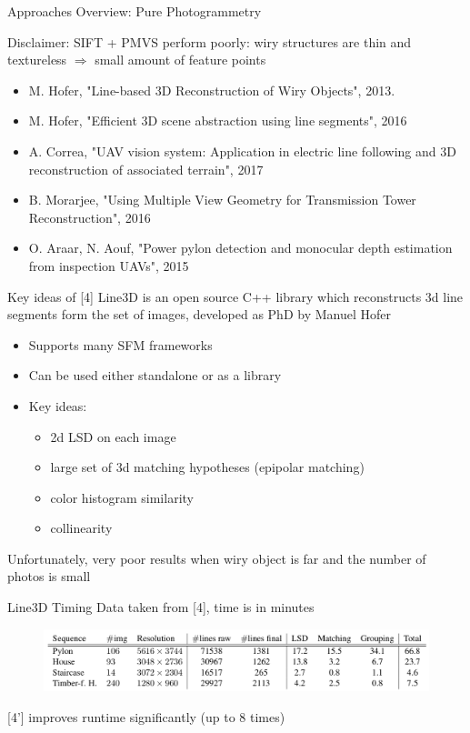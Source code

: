 \documentclass{beamer}
\begin{document}
\begin{frame}[t, fragile]{Approaches Overview: Pure Photogrammetry}

Disclaimer: SIFT + PMVS perform poorly: wiry structures are thin and textureless $\Rightarrow$ small amount of feature points 

\begin{itemize}
\item [4] M. Hofer, "Line-based 3D Reconstruction of Wiry Objects", 2013.
\item [4'] M. Hofer, "Efficient 3D scene abstraction using line segments", 2016
\item [5] A. Correa, "UAV vision system: Application in electric line following and 3D reconstruction of associated terrain", 2017
\item [6] B. Morarjee, "Using Multiple View Geometry for Transmission Tower Reconstruction", 2016

\item [7] O. Araar, N. Aouf, "Power pylon detection and monocular depth
estimation from inspection UAVs", 2015
\end{itemize}
\end{frame}

\begin{frame}[t, fragile]{Key ideas of [4]}
Line3D is an open source C++ library which reconstructs 3d line segments form the set of images, developed as PhD by Manuel Hofer
\begin{itemize}

\item Supports many SFM frameworks
\item Can be used either standalone or as a library
\item Key ideas: 
\begin{itemize}
\item 2d LSD on each image
\item large set of 3d matching hypotheses (epipolar matching)
\item color histogram similarity
\item collinearity
\end{itemize}
\end{itemize}
Unfortunately, very poor results when wiry object is far and the number of photos is small
\end{frame}

\begin{frame}[t, fragile]{Line3D Timing}
Data taken from [4], time is in minutes
\begin{figure}
\centering
\includegraphics[scale=0.25]{line3dtime}
\end{figure}

[4'] improves runtime significantly (up to 8 times)
\end{frame}
\end{document}
